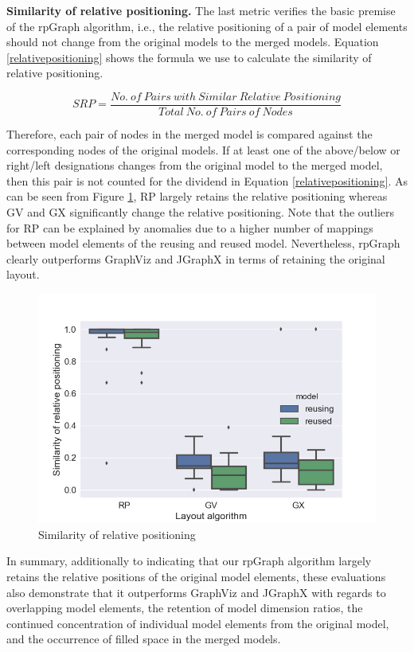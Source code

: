 \textbf{Similarity of relative positioning.} The last metric verifies the basic premise of the rpGraph algorithm, i.e., the relative positioning of a pair of model elements should not change from the original models to the merged models. Equation \ref{relativepositioning} shows the formula we use to calculate the similarity of relative positioning.

\begin{equation} \label{relativepositioning}
  SRP = \frac{No.\ of\ Pairs\ with\ Similar\ Relative\ Positioning}{Total\ No.\ of\ Pairs\ of\ Nodes}
\end{equation}

Therefore, each pair of nodes in the merged model is compared against the corresponding nodes of the original models. If at least one of the above/below or right/left designations changes from the original model to the merged model, then this pair is not counted for the dividend in Equation \ref{relativepositioning}. As can be seen from Figure \ref{fig :relative positioning}, RP largely retains the relative positioning whereas GV and GX significantly change the relative positioning. Note that the outliers for RP can be explained by anomalies due to a higher number of mappings between model elements of the reusing and reused model. Nevertheless, rpGraph clearly outperforms GraphViz and JGraphX in terms of retaining the original layout.

\begin{figure}
\includegraphics[width=0.9\linewidth]{Evaluation/similarity.png}
	\caption{Similarity of relative positioning}
	\label{fig :relative positioning}
\end{figure}

In summary, additionally to indicating that our rpGraph algorithm largely retains the relative positions of the original model elements, these evaluations also demonstrate that it outperforms GraphViz and JGraphX with regards to overlapping model elements, the retention of model dimension ratios, the continued concentration of individual model elements from the original model, and the occurrence of filled space in the merged models.

